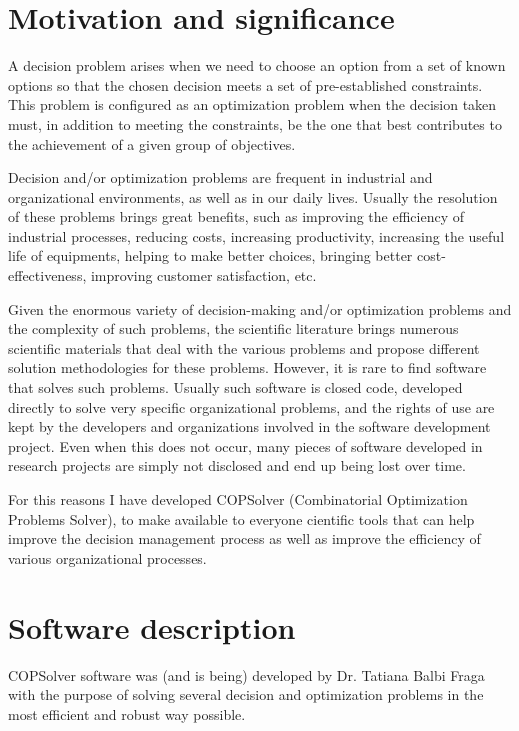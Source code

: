 \documentclass[11pt, letterpaper]{article}
\begin{document}
\section{Motivation and significance}

A decision problem arises when we need to choose an option from a set of known options so that the chosen decision meets a set of pre-established constraints. This problem is configured as an optimization problem when the decision taken must, in addition to meeting the constraints, be the one that best contributes to the achievement of a given group of objectives.

Decision and/or optimization problems are frequent in industrial and organizational environments, as well as in our daily lives. Usually the resolution of these problems brings great benefits, such as improving the efficiency of industrial processes, reducing costs, increasing productivity, increasing the useful life of equipments, helping to make better choices, bringing better cost-effectiveness, improving customer satisfaction, etc.

Given the enormous variety of decision-making and/or optimization problems and the complexity of such problems, the scientific literature brings numerous scientific materials that deal with the various problems and propose different solution methodologies for these problems. However, it is rare to find software that solves such problems. Usually such software is closed code, developed directly to solve very specific organizational problems, and the rights of use are kept by the developers and organizations involved in the software development project. Even when this does not occur, many pieces of software developed in research projects are simply not disclosed and end up being lost over time.

For this reasons I have developed COPSolver (Combinatorial Optimization Problems Solver), to make available to everyone cientific tools that can help improve the decision management process as well as improve the efficiency of various organizational processes.

\section{Software description}

COPSolver software was (and is being) developed by Dr. Tatiana Balbi Fraga with the purpose of solving several decision and optimization problems in the most efficient and robust way possible.
\end{document}
